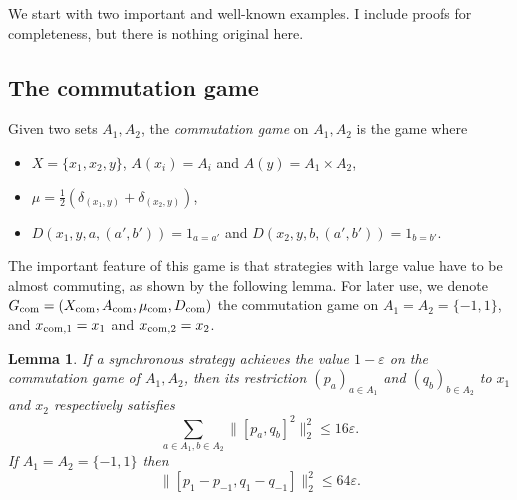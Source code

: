 \documentclass[10pt]{amsart}
\newcommand{\com}{\textup{com}}
\theoremstyle{plain}
\newtheorem{lemma}[theorem]{Lemma}
\theoremstyle{definition}
\begin{document}
We start with two important and well-known examples. I include proofs for completeness, but there is nothing original here.

\subsection{The commutation game}
Given two sets $A_1,A_2$, the \emph{commutation game} on $A_1,A_2$ is the game where
\begin{itemize}
\item $X=\{x_1,x_2,y\}$, $A(x_i) = A_i$ and $A(y) = A_1 \times A_2$,
\item $\mu = \frac 1 2 ( \delta_{(x_1,y)}+ \delta_{(x_2,y)})$,
\item $D(x_1,y,a,(a',b')) = 1_{a=a'}$ and $D(x_2,y,b,(a',b')) = 1_{b=b'}$.
\end{itemize}
The important feature of this game is that strategies with large value have to be almost commuting, as shown by the following lemma. For later use, we denote $G_{\com}= (X_{\com},A_{\com},\mu_{\com},D_{\com})$ the commutation game on $A_1=A_2=\{-1,1\}$, and $x_{\com,1}=\nobreak x_1$ and $x_{\com,2}=x_2$.
\begin{lemma}\label{lem:commutation_game} If a synchronous strategy achieves the value $1-\varepsilon$ on the commutation game of $A_1,A_2$, then its restriction $(p_a)_{a \in A_1}$ and $(q_b)_{b \in A_2}$ to $x_1$ and $x_2$ respectively satisfies
\begin{equation}\label{eq:commutation_projection}\sum_{a\in A_1,b \in A_2} \bigl\|[p_a,q_b]^2\bigr\|_2^2 \leq 16 \varepsilon.
\end{equation}
If $A_1=A_2=\{-1,1\}$ then
\begin{equation}\label{eq:commutation_unitary} \bigl\|[p_1-p_{-1},q_1-q_{-1}]\bigr\|_2^2 \leq 64 \varepsilon.
\end{equation}
\end{lemma}
\end{document}

